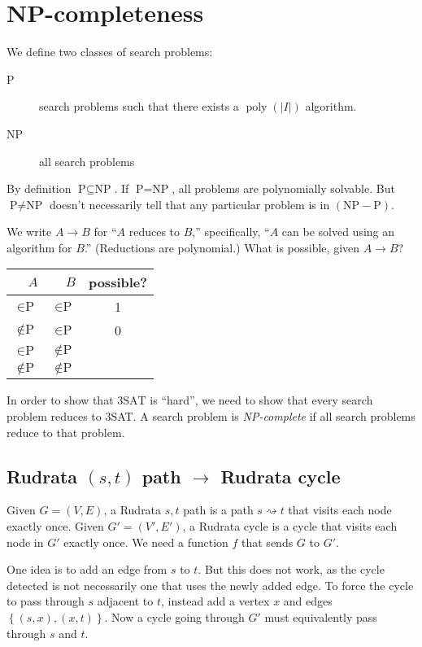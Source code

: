 \chapter{NP-completeness}
We define two classes of search problems:
\begin{description}
	\item[P] search problems such that there exists a \(\operatorname{poly}\left(\left|I\right|\right)\) algorithm.
	\item[NP] all search problems
\end{description}
By definition \(\text{P} \subseteq \text{NP}\).
If \(\text{P} = \text{NP}\), all problems are polynomially solvable.
But \(\text{P} \neq \text{NP}\) doesn't necessarily tell that any particular
problem is in \(\left(\text{NP}-\text{P}\right)\).

We write \(A\to B\) for ``\(A\) reduces to \(B\),'' specifically,
``\(A\) can be solved using an algorithm for \(B\).'' (Reductions are polynomial.)
What is possible, given \(A\to B\)?
\begin{center}
\begin{tabular}{rrc}
	               \(A\) &                \(B\) & possible? \\ \hline
	    \(\in \text{P}\) &     \(\in \text{P}\) &     1     \\
	 \(\notin \text{P}\) &     \(\in \text{P}\) &     0     \\
	    \(\in \text{P}\) & \(\not\in \text{P}\) &  \\
	\(\not\in \text{P}\) & \(\not\in \text{P}\) &
\end{tabular}
\end{center}

In order to show that \(3\text{SAT}\) is ``hard'', we need to show
that every search problem reduces to 3SAT.
A search problem is \emph{NP-complete} if all search problems reduce to that problem.

\section{Rudrata \((s, t)\) path \(\longrightarrow\) Rudrata cycle}
Given \(G = \left(V, E\right)\), a Rudrata \(s,t\) path is a path \(s\rightsquigarrow t\) that visits each node exactly once.
Given \(G' = (V', E')\), a Rudrata cycle is a cycle that visits each node in \(G'\) exactly once. We need a function \(f\) that sends \(G\) to \(G'\).

One idea is to add an edge from \(s\) to \(t\). But this does not work, as the cycle detected is not necessarily one that uses the newly added edge. To force the cycle to pass through \(s\) adjacent to \(t\), instead add a vertex \(x\) and edges \(\left\{(s, x), (x, t)\right\}\). Now a cycle going through \(G'\) must equivalently pass through \(s\) and \(t\).

